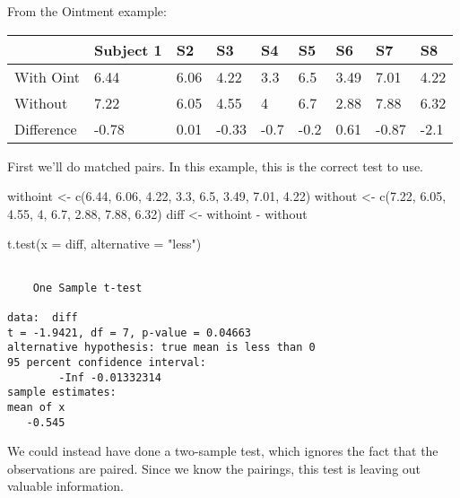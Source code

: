 \documentclass[
  letterpaper,
  DIV=11,
  numbers=noendperiod]{scrreprt}
\newenvironment{Shaded}{\begin{snugshade}}{\end{snugshade}}
\newcommand{\AttributeTok}[1]{\textcolor[rgb]{0.40,0.45,0.13}{#1}}
\newcommand{\DecValTok}[1]{\textcolor[rgb]{0.68,0.00,0.00}{#1}}
\newcommand{\FloatTok}[1]{\textcolor[rgb]{0.68,0.00,0.00}{#1}}
\newcommand{\FunctionTok}[1]{\textcolor[rgb]{0.28,0.35,0.67}{#1}}
\newcommand{\NormalTok}[1]{\textcolor[rgb]{0.00,0.23,0.31}{#1}}
\newcommand{\OtherTok}[1]{\textcolor[rgb]{0.00,0.23,0.31}{#1}}
\newcommand{\SpecialCharTok}[1]{\textcolor[rgb]{0.37,0.37,0.37}{#1}}
\newcommand{\StringTok}[1]{\textcolor[rgb]{0.13,0.47,0.30}{#1}}
\begin{document}
From the Ointment example:

\begin{longtable}[]{@{}lllllllll@{}}
\toprule\noalign{}
& Subject 1 & S2 & S3 & S4 & S5 & S6 & S7 & S8 \\
\midrule\noalign{}
\endhead
\bottomrule\noalign{}
\endlastfoot
With Oint & 6.44 & 6.06 & 4.22 & 3.3 & 6.5 & 3.49 & 7.01 & 4.22 \\
Without & 7.22 & 6.05 & 4.55 & 4 & 6.7 & 2.88 & 7.88 & 6.32 \\
Difference & -0.78 & 0.01 & -0.33 & -0.7 & -0.2 & 0.61 & -0.87 & -2.1 \\
\end{longtable}

First we'll do matched pairs. In this example, this is the correct test
to use.

\begin{Shaded}
\begin{Highlighting}[]
\NormalTok{withoint }\OtherTok{\textless{}{-}} \FunctionTok{c}\NormalTok{(}\FloatTok{6.44}\NormalTok{, }\FloatTok{6.06}\NormalTok{, }\FloatTok{4.22}\NormalTok{, }\FloatTok{3.3}\NormalTok{, }\FloatTok{6.5}\NormalTok{, }\FloatTok{3.49}\NormalTok{, }\FloatTok{7.01}\NormalTok{, }\FloatTok{4.22}\NormalTok{)}
\NormalTok{without }\OtherTok{\textless{}{-}} \FunctionTok{c}\NormalTok{(}\FloatTok{7.22}\NormalTok{, }\FloatTok{6.05}\NormalTok{, }\FloatTok{4.55}\NormalTok{, }\DecValTok{4}\NormalTok{, }\FloatTok{6.7}\NormalTok{, }\FloatTok{2.88}\NormalTok{, }\FloatTok{7.88}\NormalTok{, }\FloatTok{6.32}\NormalTok{)}
\NormalTok{diff }\OtherTok{\textless{}{-}}\NormalTok{ withoint }\SpecialCharTok{{-}}\NormalTok{ without}

\FunctionTok{t.test}\NormalTok{(}\AttributeTok{x =}\NormalTok{ diff, }\AttributeTok{alternative =} \StringTok{"less"}\NormalTok{)}
\end{Highlighting}
\end{Shaded}

\begin{verbatim}

    One Sample t-test

data:  diff
t = -1.9421, df = 7, p-value = 0.04663
alternative hypothesis: true mean is less than 0
95 percent confidence interval:
        -Inf -0.01332314
sample estimates:
mean of x 
   -0.545 
\end{verbatim}

We could instead have done a two-sample test, which ignores the fact
that the observations are paired. Since we know the pairings, this test
is leaving out valuable information.
\end{document}
